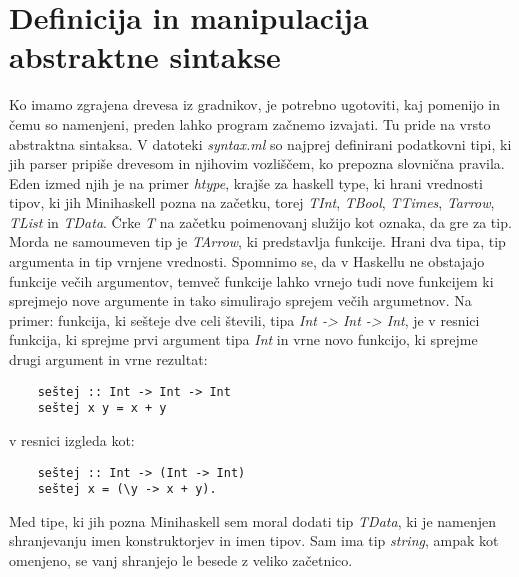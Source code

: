 \documentclass[12pt,a4paper,openany]{book}
\begin{document}
\section{Definicija in manipulacija abstraktne sintakse}
Ko imamo zgrajena drevesa iz gradnikov, je potrebno ugotoviti, kaj pomenijo in čemu so namenjeni, preden lahko program začnemo izvajati. Tu pride na vrsto abstraktna sintaksa. 
V datoteki \emph{syntax.ml} so najprej definirani podatkovni tipi, ki jih parser pripiše drevesom in njihovim vozliščem, ko prepozna slovnična pravila. Eden izmed njih je na primer 
\emph{htype}, krajše za haskell type, ki hrani vrednosti tipov, ki jih Minihaskell pozna na začetku, torej \emph{TInt}, \emph{TBool}, \emph{TTimes}, \emph{Tarrow}, \emph{TList} in 
\emph{TData}. Črke \emph{T} na začetku poimenovanj služijo kot oznaka, da gre za tip. Morda ne samoumeven tip je \emph{TArrow}, ki predstavlja funkcije. Hrani dva tipa, tip argumenta
in tip vrnjene vrednosti. Spomnimo se, da v Haskellu ne obstajajo funkcije večih argumentov, temveč funkcije lahko vrnejo tudi nove funkcijem ki sprejmejo nove argumente in tako 
simulirajo sprejem večih argumetnov. Na primer: funkcija, ki sešteje dve celi števili, tipa \emph{Int -> Int -> Int}, je v resnici funkcija, ki sprejme prvi argument tipa \emph{Int}
in vrne novo funkcijo, ki sprejme drugi argument in vrne rezultat:
\begin{lstlisting}
	seštej :: Int -> Int -> Int
	seštej x y = x + y
\end{lstlisting}
v resnici izgleda kot:
\begin{lstlisting}
	seštej :: Int -> (Int -> Int)
	seštej x = (\y -> x + y).
\end{lstlisting}
Med tipe, ki jih pozna Minihaskell sem moral dodati tip \emph{TData}, ki je namenjen shranjevanju imen konstruktorjev in imen tipov. Sam ima tip \emph{string}, ampak kot omenjeno, 
se vanj shranjejo le besede z veliko začetnico. 
\end{document}
